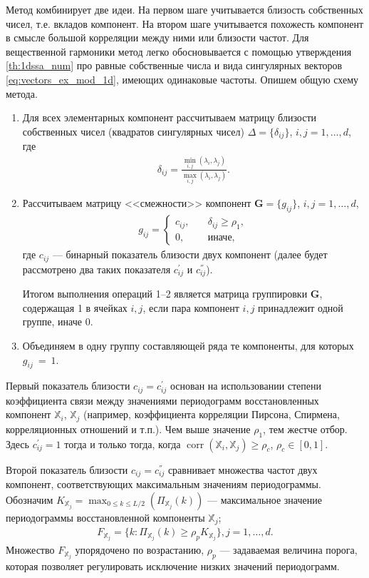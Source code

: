 \documentclass[specialist,
               substylefile = spbu.rtx,
               subf,href,colorlinks=true, 12pt]{disser}
\def\corr{\mathop{\mathrm{corr}}}
\begin{document}
Метод комбинирует две идеи. На первом шаге учитывается близость собственных чисел, т.е. вкладов компонент. На втором шаге учитывается похожесть компонент в смысле большой корреляции между ними или близости частот.
Для вещественной гармоники метод легко обосновывается с помощью утверждения \ref{th:1dssa_num} про равные собственные числа и вида сингулярных векторов \eqref{eq:vectors_ex_mod_1d}, имеющих одинаковые частоты.
Опишем общую схему метода.
\begin{enumerate}
\item Для всех элементарных компонент рассчитываем матрицу близости собственных чисел (квадратов сингулярных чисел) $\Delta = \{\delta_{ij}\}$, $i,j=1,\ldots,d$, где
\begin{gather}
\label{eq:delta}
\delta_{ij} = \frac{\min_{i, j}(\lambda_i, \lambda_j)}{\max_{i,j}(\lambda_i, \lambda_j)}.
\end{gather}
\item Рассчитываем матрицу <<смежности>> компонент $\mathbf{G}=\{g_{ij}\}$, $i,j = 1,\ldots,d$,
\begin{gather} \label{eq:g_ij}
g_{ij} =
\begin{cases}
c_{ij}, &\quad \delta_{ij} \geqslant \rho_1, \\
0, &\quad \text{иначе},
\end{cases}
\end{gather}
где $c_{ij}$ --- бинарный показатель близости двух компонент (далее будет рассмотрено два таких показателя  $c^{'}_{ij}$ и  $c^{''}_{ij}$).

Итогом выполнения операций 1--2 является матрица группировки $\mathbf{G}$, содержащая 1 в ячейках $i,j$, если пара компонент $i,j$ принадлежит одной группе, иначе 0.
\item Объединяем в одну группу составляющей ряда те  компоненты, для которых $g_{ij}~=~1$.
\end{enumerate}

Первый показатель близости $c_{ij} = c^{'}_{ij}$ основан на использовании
степени коэффициента связи между значениями периодограмм восстановленных компонент $\mathbb{X}_i$, $\mathbb{X}_j$ (например, коэффициента корреляции Пирсона, Спирмена, корреляционных отношений и т.п.). Чем выше значение $\rho_1$, тем жестче отбор.
Здесь $c^{'}_{ij} = 1$ тогда и только тогда, когда $\corr(\mathbb{X}_i, \mathbb{X}_j) \geqslant \rho_c$, $\rho_c \in [0,1]$.

Второй показатель близости $c_{ij} =c^{''}_{ij}$ сравнивает множества частот двух компонент, соответствующих максимальным значениям периодограммы.
Обозначим
$K_{\mathbb{X}_j} = \max_{0\leqslant k \leqslant L/2}\left(\Pi_{\mathbb{X}_j}(k)\right)$ --- максимальное значение периодограммы восстановленной компоненты $\mathbb{X}_j$;
\begin{gather} \label{eq:f_j}
F_{\mathbb{X}_j} =  \{ k: \Pi_{\mathbb{X}_j}(k) \geqslant \rho_p K_{\mathbb{X}_j}  \}, j = 1,\ldots, d.
\end{gather}
Множество $F_{\mathbb{X}_j}$ упорядочено по возрастанию, $\rho_p$ --- задаваемая величина порога, которая позволяет регулировать исключение низких значений периодограмм.
\end{document}
